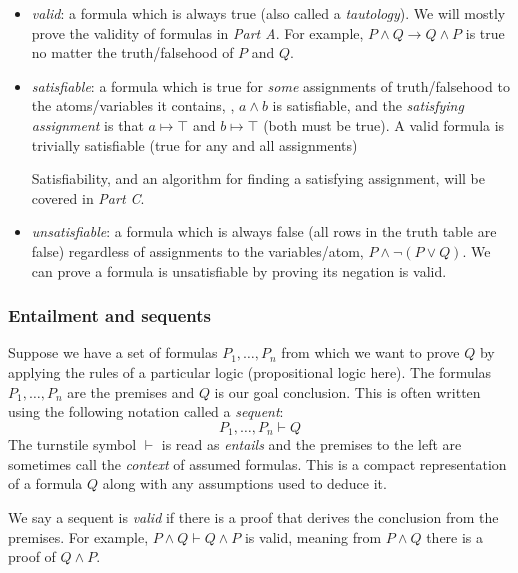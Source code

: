 \begin{itemize}[leftmargin=1.5em]
  \item \emph{valid}: a formula which is always true (also
  called a \emph{tautology}). We will
  mostly prove the validity of formulas in \emph{Part A}. For example, $P \wedge Q
  \rightarrow Q \wedge P$ is true no matter the
  truth/falsehood of $P$ and $Q$.
%
  \item \emph{satisfiable}: a formula which is true for
  \emph{some} assignments of truth/falsehood to the atoms/variables it contains, \eg{},
  $a \wedge b$ is satisfiable, and the \emph{satisfying assignment} is that
  $a \mapsto \top$ and $b \mapsto \top$ (both must be true). A valid formula
  is trivially satisfiable (true for any and all assignments)

  Satisfiability, and an algorithm for finding a satisfying assignment,
  will be covered in \emph{Part C}.

  \item \emph{unsatisfiable}: a formula which is always false (all
  rows in the truth table are false) regardless of assignments to the
  variables/atom, \eg{} $P \wedge \neg (P \vee Q)$. We can
  prove a formula is unsatisfiable by proving its negation is valid.
\end{itemize}

\subsubsection{Entailment and sequents}
\label{sec:entailment}

Suppose we have a set of formulas $P_1, \ldots, P_n$ from which we
want to prove $Q$ by applying the rules of a particular logic
(propositional logic here). The formulas $P_1, \ldots, P_n$ are the
premises and $Q$ is our goal conclusion. This is often written using the
following notation called a \emph{sequent}:
%
\begin{equation*}
P_1, \ldots, P_n \vdash Q
\end{equation*}
%
The turnstile symbol $\vdash$ is read as \emph{entails} and the
premises to the left are sometimes call the \emph{context} of assumed
formulas. This is a compact representation of a formula $Q$ along with
any assumptions used to deduce it.

We say a sequent is \emph{valid} if there is a proof that derives the conclusion from the premises. For example,
$P \wedge Q \vdash Q \wedge P$ is valid, meaning from $P \wedge Q$
there is a proof of $Q \wedge P$. %

